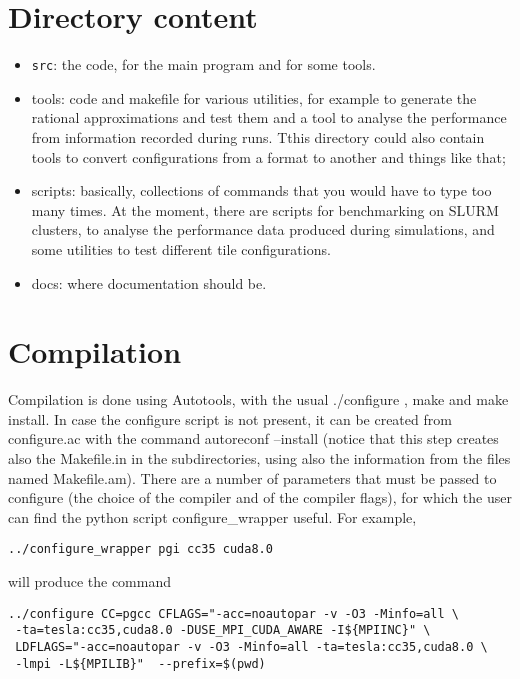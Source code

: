 

\section{Directory content}

\begin{itemize}
    \item \texttt{src}: the code, for the main program and for some tools.
    \item tools: code and makefile for various utilities, for example to generate the rational approximations and test them and a tool to analyse the performance from information recorded during runs. Tthis directory could also contain tools to convert configurations from a format to another and things like that; 
    \item scripts: basically, collections of commands that you would have to type too many times. 
    At the moment, there are scripts for benchmarking on SLURM clusters, to analyse the performance data produced during simulations,
    and some utilities to test different {\sf tile} configurations.
    \item docs: where documentation should be.
\end{itemize}
\section{Compilation}
\label{compilation}
Compilation is done using Autotools, with the usual {\sf ./configure} , {\sf make} and {\sf make install}.
In case the {\sf configure} script is not present, it can be created from {\sf configure.ac} 
with the command{ \sf autoreconf --install} (notice that this step creates also the {\sf Makefile.in} in the subdirectories, 
using also the information from the files named {\sf Makefile.am}). 
There are a number of parameters that must be passed to {\sf configure} (the choice of the compiler and of the compiler flags), for which the user can find the python script {\sf configure\_wrapper} useful. For example,
\begin{verbatim}
../configure_wrapper pgi cc35 cuda8.0
\end{verbatim}
will produce the command
\begin{verbatim}
../configure CC=pgcc CFLAGS="-acc=noautopar -v -O3 -Minfo=all \
 -ta=tesla:cc35,cuda8.0 -DUSE_MPI_CUDA_AWARE -I${MPIINC}" \
 LDFLAGS="-acc=noautopar -v -O3 -Minfo=all -ta=tesla:cc35,cuda8.0 \
 -lmpi -L${MPILIB}"  --prefix=$(pwd)
\end{verbatim}

